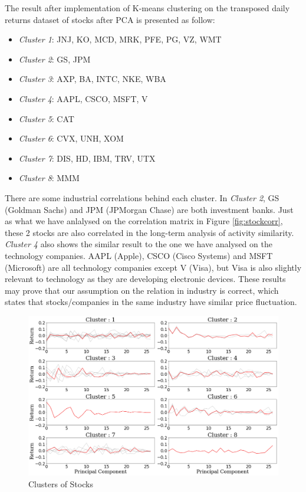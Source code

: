\documentclass[11pt]{article} %
\theoremstyle{plain}
\theoremstyle{definition}
\begin{document}
The result after implementation of K-means clustering on the transposed daily returns dataset of stocks after PCA is presented as follow:
\begin{itemize}
    \item \textsl{Cluster 1}: JNJ, KO, MCD, MRK, PFE, PG, VZ, WMT
    \item \textsl{Cluster 2}: GS, JPM
    \item \textsl{Cluster 3}: AXP, BA, INTC, NKE, WBA
    \item \textsl{Cluster 4}: AAPL, CSCO, MSFT, V
    \item \textsl{Cluster 5}: CAT
    \item \textsl{Cluster 6}: CVX, UNH, XOM
    \item \textsl{Cluster 7}: DIS, HD, IBM, TRV, UTX
    \item \textsl{Cluster 8}: MMM
\end{itemize}

There are some industrial correlations behind each cluster. In \textsl{Cluster 2}, GS (Goldman Sachs) and JPM (JPMorgan Chase) are both investment banks. Just as what we have anlalysed on the correlation matrix in Figure \ref{fig:stockcorr}, these 2 stocks are also correlated in the long-term analysis of activity similarity. \textsl{Cluster 4} also shows the similar result to the one we have analysed on the technology companies. AAPL (Apple), CSCO (Cisco Systems) and MSFT (Microsoft) are all technology companies except V (Visa), but Visa is also slightly relevant to technology as they are developing electronic devices. These results may prove that our assumption on the relation in industry is correct, which states that stocks/companies in the same industry have similar price fluctuation.

\begin{figure}[ht]
    \includegraphics[width=1\linewidth, center]{resources/stock_kmeans.png}
    \caption{Clusters of Stocks}
    \label{fig:stockkmeans}
\end{figure}
\end{document}
